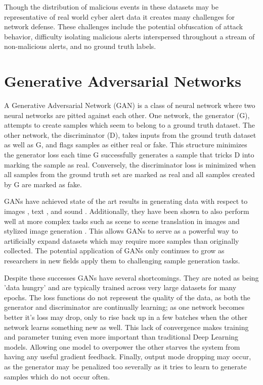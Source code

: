 \documentclass[12pt,american]{report}
\begin{document}
Though the distribution of malicious events in these datasets may be representative of real world cyber alert data it creates many challenges for network defense. These challenges include the potential obfuscation of attack behavior, difficulty isolating malicious alerts interspersed throughout a stream of non-malicious alerts, and no ground truth labels. 

\section{Generative Adversarial Networks}

A Generative Adversarial Network (GAN) is a class of neural network where two neural networks are pitted against each other. One network, the generator (G), attempts to create samples which seem to belong to a ground truth dataset. The other network, the discriminator (D), takes inputs from the ground truth dataset as well as G, and flags samples as either real or fake. This structure minimizes the generator loss each time G successfully generates a sample that tricks D into marking the sample as real. Conversely, the discriminator loss is minimized when all samples from the ground truth set are marked as real and all samples created by G are marked as fake.

GANs have achieved state of the art results in generating data with respect to images \cite {Karras2018, Zhu2017, Ledig2016}, text \cite{Su2018}, and sound \cite{Dong2018, Gao2018}.  Additionally, they have been shown to also perform well at more complex tasks such as scene to scene translation in images \cite{Zhu2017, Choi2017} and stylized image generation \cite{Karras2018}. This allows GANs to serve as a powerful way to artificially expand datasets which may require more samples than originally collected. The potential application of GANs only continues to grow as researchers in new fields apply them to challenging sample generation tasks.

Despite these successes GANs have several shortcomings. They are noted as being 'data hungry' and are typically trained across very large datasets for many epochs. The loss functions do not represent the quality of the data, as both the generator and discriminator are continually learning; as one network becomes better it's loss may drop, only to rise back up in a few batches when the other network learns something new as well. This lack of convergence makes training and parameter tuning even more important than traditional Deep Learning models. Allowing one model to overpower the other starves the system from having any useful gradient feedback. Finally, output mode dropping may occur, as the generator may be penalized too severally as it tries to learn to generate samples which do not occur often. 
\end{document}
